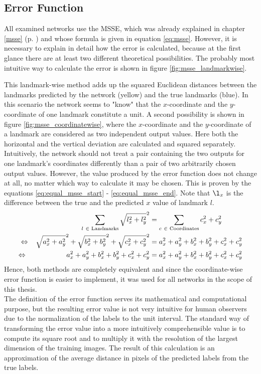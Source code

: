 \documentclass[11pt, a4paper]{article}
\renewcommand\equiv{\Leftrightarrow}
\newcommand\myref[1]{\ref{#1} (p. \pageref{#1})}
\begin{document}
\subsection{Error Function}

All examined networks use the \ac{MSSE}, which was already explained in chapter \myref{msse} and whose formula is given in equation \eqref{eq:msse}. However, it is necessary to explain in detail how the error is calculated, because at the first glance there are at least two different theoretical possibilities. The probably most intuitive way to calculate the error is shown in figure \ref{fig:msse_landmarkwise}.

This landmark-wise method adds up the squared Euclidean distances between the landmarks predicted by the network (yellow) and the true landmarks (blue). In this scenario the network seems to "know" that the $x$-coordinate and the $y$-coordinate of one landmark constitute a unit. A second possibility is shown in figure \ref{fig:msse_coordinatewise}, where the $x$-coordinate and the $y$-coordinate of a landmark are considered as two independent output values. Here both the horizontal and the vertical deviation are calculated and squared separately. Intuitively, the network should not treat a pair containing the two outputs for one landmark's coordinates differently than a pair of two arbitrarily chosen output values. However, the value produced by the error function does not change at all, no matter which way to calculate it may be chosen. This is proven by the equations \eqref{eq:equal_msse_start} - \eqref{eq:equal_msse_end}. Note that $\l_x$ is the difference between the true and the predicted $x$ value of landmark $l$.
\begin{align}
\label{eq:equal_msse_start}
\sum_{l\ \in \text{ Landmarks}} \sqrt{l_x^2 + l_y^2}^2 &= \sum_{c\ \in \text{ Coordinates}} c_x^2 + c_y^2\\
\equiv \hspace{0.3cm} \sqrt{a_x^2 + a_y^2}^2 + \sqrt{b_x^2 + b_y^2}^2 + \sqrt{c_x^2 + c_y^2}^2 &= a_x^2 + a_y^2 + b_x^2 + b_y^2 + c_x^2 + c_y^2\\
\label{eq:equal_msse_end}
\equiv \hspace{1.95cm} a_x^2 + a_y^2 + b_x^2 + b_y^2 + c_x^2 + c_y^2 &= a_x^2 + a_y^2 + b_x^2 + b_y^2 + c_x^2 + c_y^2
\end{align}
Hence, both methods are completely equivalent and since the coordinate-wise error function is easier to implement, it was used for all networks in the scope of this thesis.\\
The definition of the error function serves its mathematical and computational purpose, but the resulting error value is not very intuitive for human observers due to the normalization of the labels to the unit interval. The standard way of transforming the error value into a more intuitively comprehensible value is to compute its square root and to multiply it with the resolution of the largest dimension of the training images. The result of this calculation is an approximation of the average distance in pixels of the predicted labels from the true labels.
\end{document}

